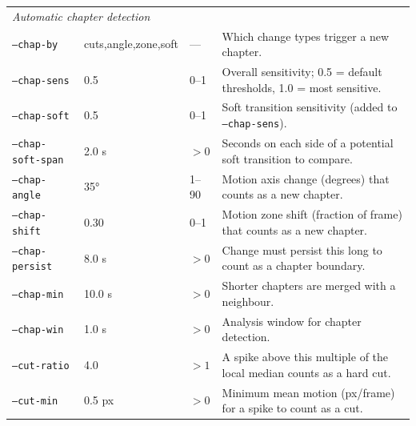 \documentclass[11pt,a4paper]{article}
\newcommand{\code}[1]{\texttt{#1}}
\begin{document}
\begin{longtable}{p{3.2cm} p{2.2cm} p{1.5cm} p{7.5cm}}
  \multicolumn{4}{l}{\textit{Automatic chapter detection}} \\
  \code{--chap-by}       & cuts,angle,zone,soft & --- & Which change types trigger a new chapter. \\
  \code{--chap-sens}     & 0.5       & 0--1       & Overall sensitivity; 0.5 = default thresholds, 1.0 = most sensitive. \\
  \code{--chap-soft}     & 0.5       & 0--1       & Soft transition sensitivity (added to \code{--chap-sens}). \\
  \code{--chap-soft-span}& 2.0 s     & $>0$       & Seconds on each side of a potential soft transition to compare. \\
  \code{--chap-angle}    & 35°       & 1--90      & Motion axis change (degrees) that counts as a new chapter. \\
  \code{--chap-shift}    & 0.30      & 0--1       & Motion zone shift (fraction of frame) that counts as a new chapter. \\
  \code{--chap-persist}  & 8.0 s     & $>0$       & Change must persist this long to count as a chapter boundary. \\
  \code{--chap-min}      & 10.0 s    & $>0$       & Shorter chapters are merged with a neighbour. \\
  \code{--chap-win}      & 1.0 s     & $>0$       & Analysis window for chapter detection. \\
  \code{--cut-ratio}     & 4.0       & $>1$       & A spike above this multiple of the local median counts as a hard cut. \\
  \code{--cut-min}       & 0.5 px    & $>0$       & Minimum mean motion (px/frame) for a spike to count as a cut. \\


\end{longtable}
\end{document}
